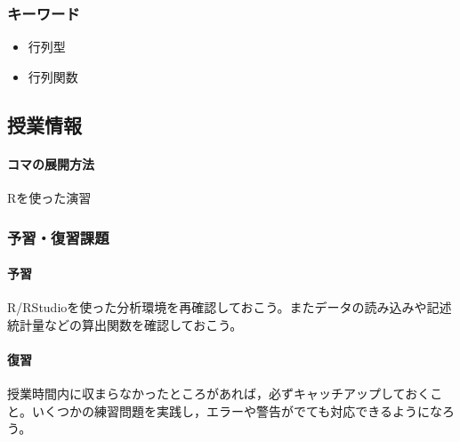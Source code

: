 \subsubsection{キーワード}
\begin{itemize}
\item 行列型
\item 行列関数
\end{itemize}
\subsection{授業情報}
\paragraph{コマの展開方法}
Rを使った演習
\subsubsection{予習・復習課題}
\paragraph{予習}R/RStudioを使った分析環境を再確認しておこう。またデータの読み込みや記述統計量などの算出関数を確認しておこう。
\paragraph{復習}授業時間内に収まらなかったところがあれば，必ずキャッチアップしておくこと。いくつかの練習問題を実践し，エラーや警告がでても対応できるようになろう。
